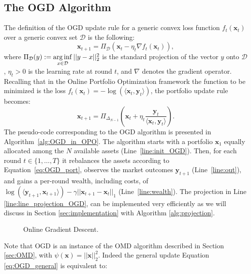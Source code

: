 \subsection{The OGD Algorithm}
\label{sec:OGD}
The definition of the OGD update rule for a generic convex loss function $f_t(\mathbf{x}_t)$ over a generic convex set $\mathcal D$ is the following:
\begin{equation}\label{eq:OGD_general}
  \mathbf{x}_{t+1} = \Pi_{\mathcal D} \left( \mathbf{x}_t - \eta_t \nabla f_t(\mathbf{x}_t) \right),
\end{equation}
where $\Pi_{\mathcal D} (y) := \operatorname*{arg\,inf}\limits_{x \in \mathcal D } || y - x ||_2^2$ is the standard projection of the vector $y$ onto $\mathcal D$, $\eta_t > 0$ is the learning rate at round $t$, and $\nabla$ denotes the gradient operator.
Recalling that in the Online Portfolio Optimization framework the function to be minimized is the loss $f_t(\mathbf{x}_t) = -\log (\langle \mathbf{x}_t, \mathbf{y}_t \rangle )$, the portfolio update rule becomes:
\begin{equation} \label{eq:OGD_port}
   \mathbf{x}_{t+1}= \Pi_{\Delta_{N-1}}\left( \mathbf{x}_t+\eta_t \frac{\mathbf{y}_t}{\langle \mathbf{x}_t, \mathbf{y}_t \rangle}\right).
\end{equation}
The pseudo-code corresponding to the OGD algorithm is presented in Algorithm~\ref{alg:OGD_in_OPO}. 
The algorithm starts with a portfolio $\mathbf{x}_1$ equally allocated among the $N$ available assets (Line~\ref{line:init_OGD}).
Then, for each round $t \in \{ 1, \ldots, T \}$ it rebalances the assets according to Equation~\eqref{eq:OGD_port}, observes the market outcomes $\mathbf{y}_{t+1}$ (Line~\ref{line:out}), and gains a per-round wealth, including costs, of $\log(\langle \mathbf{y}_{t+1},\mathbf{x}_{t+1} \rangle) - \gamma|| \mathbf{x}_{t+1} - \mathbf{x}_{t} ||_1$ (Line~\ref{line:wealth}). The projection in Line \ref{line:line_projection_OGD}, can be implemented very efficiently as we will discuss in Section \ref{sec:implementation} with Algorithm \ref{alg:projection}.

\begin{figure}[t!]
\centering

\caption{Online Gradient Descent.}
\label{fig:OGD}
\end{figure}

Note that OGD is an instance of the OMD algorithm described in Section \ref{sec:OMD}, with $\psi(\mathbf x)=||\mathbf x||_2^2$. Indeed the general update Equation \eqref{eq:OGD_general} is equivalent to:

